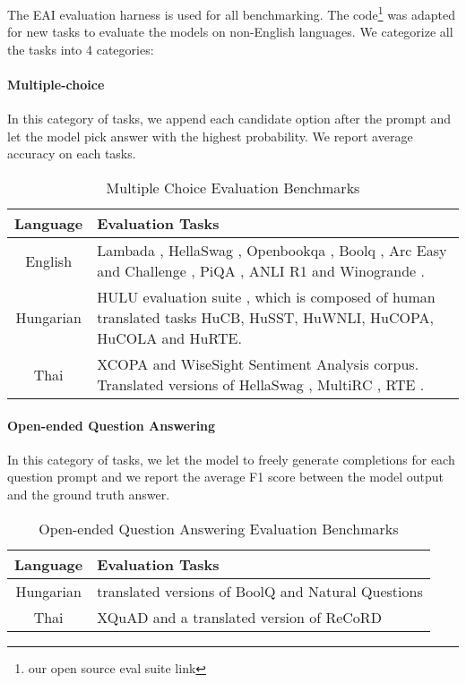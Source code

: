 The EAI evaluation harness\cite{eval-harness} is used for all benchmarking. The code\footnote{our open source eval suite link} was adapted for new tasks to evaluate the models on non-English languages. We categorize all the tasks into 4 categories:


\paragraph{Multiple-choice} In this category of tasks, we append each candidate option after the prompt and let the model pick answer with the highest probability. We report average accuracy on each tasks.

\begin{table}[!h]
\centering
\caption{Multiple Choice Evaluation Benchmarks}
\label{tab:table-label}
\begin{tabular}{|c|m{}|}
\hline
\textbf{Language} & \textbf{Evaluation Tasks} \\
\hline
English & Lambada \cite{paperno2016lambada}, HellaSwag \cite{zellers2019hellaswag}, Openbookqa \cite{mihaylov2018suit}, Boolq \cite{clark2019boolq}, Arc Easy and Challenge \cite{clark2018think}, PiQA \cite{bisk2019piqa}, ANLI R1 \cite{nie2020adversarial} and Winogrande \cite{sakaguchi2019winogrande}. \\
\hline
Hungarian & HULU evaluation suite \cite{ligetinagy2022hulu}, which is composed of human translated tasks HuCB, HuSST, HuWNLI, HuCOPA, HuCOLA and HuRTE. \\
\hline
Thai &  XCOPA \cite{ponti2020xcopa} and WiseSight Sentiment Analysis \cite{bact_2019_3457447} corpus. Translated versions of HellaSwag \cite{zellers2019hellaswag}, MultiRC \cite{MultiRC2018}, RTE \cite{wang2019superglue}. \\
\hline
\end{tabular}
\end{table}


\paragraph{Open-ended Question Answering} In this category of tasks, we let the model to freely generate completions for each question prompt and we report the average F1 score between the model output and the ground truth answer. 

\begin{table}[!h]
\centering
\caption{Open-ended Question Answering Evaluation Benchmarks}
\label{tab:table-label}
\begin{tabular}{|c|m{}|}
\hline
\textbf{Language} & \textbf{Evaluation Tasks} \\
\hline
Hungarian & translated versions of BoolQ \cite{clark2019boolq} and Natural Questions \cite{47761} \\
\hline
Thai &  XQuAD \cite{Artetxe:etal:2019} and a translated version of ReCoRD \cite{Zhang2018ReCoRDBT} \\
\hline
\end{tabular}
\end{table}







